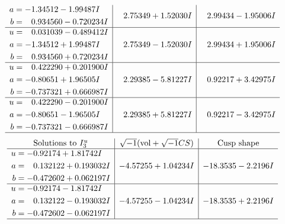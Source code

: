 \documentclass[1p]{elsarticle_modified}
\theoremstyle{definition}
\newcommand{\I}{\sqrt{-1}}
\begin{document}
$$\begin{array}{c|c|c}
\begin{aligned}
a &= -1.34512 - 1.99487 I \\
b &= \phantom{-}0.934560 - 0.720234 I\end{aligned}
 & \phantom{-}2.75349 + 1.52030 I & \phantom{-}2.99434 - 1.95006 I \\ \hline\begin{aligned}
u &= \phantom{-}0.031039 - 0.489412 I \\
a &= -1.34512 + 1.99487 I \\
b &= \phantom{-}0.934560 + 0.720234 I\end{aligned}
 & \phantom{-}2.75349 - 1.52030 I & \phantom{-}2.99434 + 1.95006 I \\ \hline\begin{aligned}
u &= \phantom{-}0.422290 + 0.201900 I \\
a &= -0.80651 + 1.96505 I \\
b &= -0.737321 + 0.666987 I\end{aligned}
 & \phantom{-}2.29385 - 5.81227 I & \phantom{-}0.92217 + 3.42975 I \\ \hline\begin{aligned}
u &= \phantom{-}0.422290 - 0.201900 I \\
a &= -0.80651 - 1.96505 I \\
b &= -0.737321 - 0.666987 I\end{aligned}
 & \phantom{-}2.29385 + 5.81227 I & \phantom{-}0.92217 - 3.42975 I\\
 \hline 
 \end{array}$$\newpage$$\begin{array}{c|c|c}  
\text{Solutions to }I^u_{3}& \I (\text{vol} + \sqrt{-1}CS) & \text{Cusp shape}\\
 \hline 
\begin{aligned}
u &= -0.92174 + 1.81742 I \\
a &= \phantom{-}0.132122 + 0.193032 I \\
b &= -0.472602 + 0.062197 I\end{aligned}
 & -4.57255 + 1.04234 I & -18.3535 - 2.2196 I \\ \hline\begin{aligned}
u &= -0.92174 - 1.81742 I \\
a &= \phantom{-}0.132122 - 0.193032 I \\
b &= -0.472602 - 0.062197 I\end{aligned}
 & -4.57255 - 1.04234 I & -18.3535 + 2.2196 I\\
 \hline 
 \end{array}$$\newpage\newpage\renewcommand{\arraystretch}{1}
\end{document}
